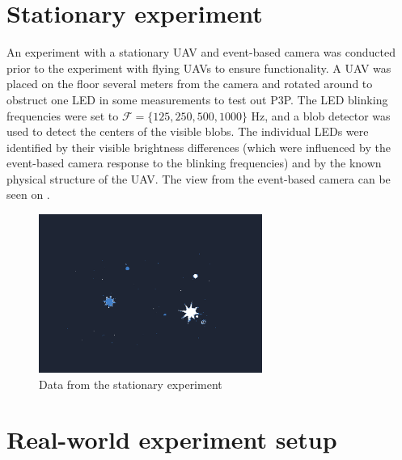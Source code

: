 \section{Stationary experiment\label{sec:stationary_experiment}}
An experiment with a stationary \ac{UAV} and event-based camera was conducted prior to the experiment with flying \ac{UAV}s to ensure functionality.
A \ac{UAV} was placed on the floor several meters from the camera and rotated around to obstruct one \ac{LED} in some measurements to test out \ac{P3P}. The \ac{LED} blinking frequencies were set to $\mathcal{F} = \{125, 250, 500, 1000\}$ Hz, and a blob detector was used to detect the centers of the visible blobs. The individual \ac{LED}s were identified by their visible
brightness differences (which were influenced by the event-based camera response to the blinking frequencies) and by the known physical structure of the \ac{UAV}. The view from the event-based camera can be seen on .
\begin{figure}[H]
	\centering
	\includegraphics[width=0.65\textwidth]{./fig/photos/pnpmeas.png}
	\caption{Data from the stationary experiment}
	\label{fig:pnpuav}
\end{figure}

\section{Real-world experiment setup}

